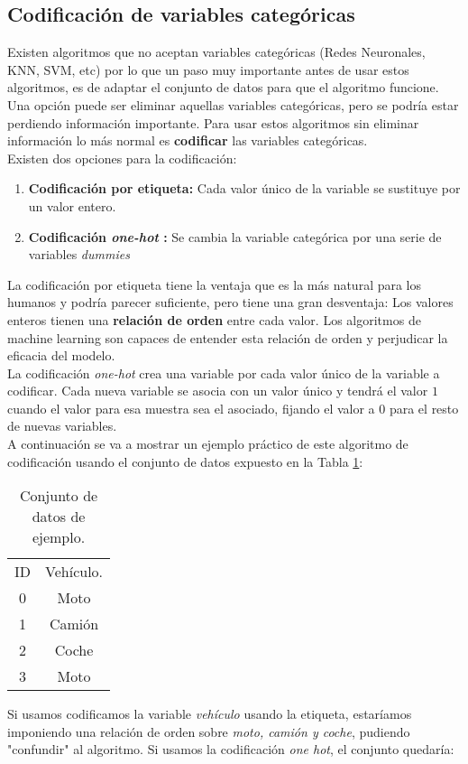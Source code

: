 \subsection{Codificación de variables categóricas}
Existen algoritmos que no aceptan variables categóricas (Redes Neuronales, KNN, SVM, etc) por lo que un paso muy importante antes de usar estos algoritmos, es de adaptar el conjunto de datos para que el algoritmo funcione. \\
Una opción puede ser eliminar aquellas variables categóricas, pero se podría estar perdiendo información importante. Para usar estos algoritmos sin eliminar información lo más normal es \textbf{codificar} las variables categóricas.\\
Existen dos opciones para la codificación:
\begin{enumerate}
	\item \textbf{Codificación por etiqueta:} Cada valor único de la variable se sustituye por un valor entero.
	\item\textbf{Codificación \textit{one-hot }:} Se cambia la variable categórica por una serie de variables \textit{dummies}
\end{enumerate}

La codificación por etiqueta tiene la ventaja que es la más natural para los humanos y podría parecer suficiente, pero tiene una gran desventaja: Los valores enteros tienen una \textbf{relación de orden} entre cada valor. Los algoritmos de machine learning son capaces de entender esta relación de orden y perjudicar la eficacia del modelo.\\
\linebreak
La codificación \textit{one-hot} crea una variable por cada valor único de la variable a codificar. Cada nueva variable se asocia con un valor único y tendrá el valor $1$ cuando el valor para esa muestra sea el asociado, fijando el valor a $0$ para el resto de nuevas variables. \\
\linebreak
A continuación se va a mostrar un ejemplo práctico de este algoritmo de codificación usando el conjunto de datos expuesto en la Tabla \ref{tab:conjunto_ejemplo}:
\begin{table}[H]
	\centering
	\begin{tabular}{|c|c|}
		\cline{1-2}
		ID & Vehículo. \\ \cline{1-2}
		0  & Moto      \\ \cline{1-2}
		1  & Camión    \\ \cline{1-2}
		2  & Coche     \\ \cline{1-2}
		3  & Moto      \\ \cline{1-2}
	\end{tabular}
	\caption{Conjunto de datos de ejemplo.}
	\label{tab:conjunto_ejemplo}
\end{table}
Si usamos codificamos la variable \textit{vehículo} usando la etiqueta, estaríamos imponiendo una relación de orden sobre \textit{moto, camión y coche}, pudiendo "confundir" al algoritmo. Si usamos la codificación \textit{one hot}, el conjunto quedaría:

